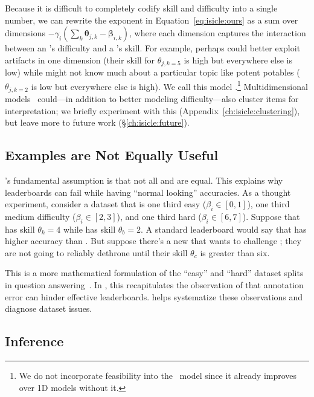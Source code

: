 Because it is difficult to completely codify skill and difficulty into
a single number, we can rewrite the exponent in
Equation~\ref{eq:isicle:ours} as a sum over dimensions
$-\gamma_i(\sum_k \bm{\theta}_{j,k}-\bm{\beta}_{i,k})$,
where each dimension captures the interaction between an \itm{}'s
difficulty and a \subj{}'s skill.
For example, perhaps \dumb{} could better exploit artifacts in one
dimension (their skill for $\theta_{j,k=5}$ is high but everywhere
else is low) while \smart{} might not know much about a particular
topic like potent potables ($\theta_{j,k=2}$ is low but everywhere
else is high).
We call this model {\bf {}}.\footnote{
  We do not incorporate feasibility into the ~model since it already improves over 1D models without it.
}
Multidimensional \irt{} models~\citep{reckase2009mirt} could---in addition to better modeling
difficulty---also cluster items for interpretation; we briefly
experiment with this (Appendix~\ref{ch:isicle:clustering}), but leave
more to future work (\S\ref{ch:isicle:future}).

\subsection{Examples are Not Equally Useful}

\irt{}'s fundamental assumption is that not all \itms{} and
\subjs{} are equal.
This explains why leaderboards can fail while having
``normal looking'' accuracies.
As a thought experiment, consider a dataset that is one third easy
($\beta_i \in [0,1]$), one third medium difficulty
($\beta_i \in [2,3]$), and one third hard ($\beta_i \in [6,7]$).
Suppose that \smart{} has skill $\theta_{k}=4$ while \dumb{} has skill
$\theta_{b}= 2$.
A standard leaderboard would say that \smart{} has higher accuracy
than \dumb{}.
But suppose there's a new \subj{} that wants to challenge \smart{};
they are not going to reliably dethrone \smart{} until their skill
$\theta_{c}$ is greater than six.

This is a more mathematical formulation of the ``easy'' and ``hard''
dataset splits in question
answering~\citep{sugawara2018easier,Rondeau2018-um,sen2020learn}.
In , this recapitulates the observation of
\citet{boydgraber2020nerds} that annotation error can hinder effective
leaderboards.
\name{} helps systematize these observations and diagnose dataset issues.


\subsection{Inference}


